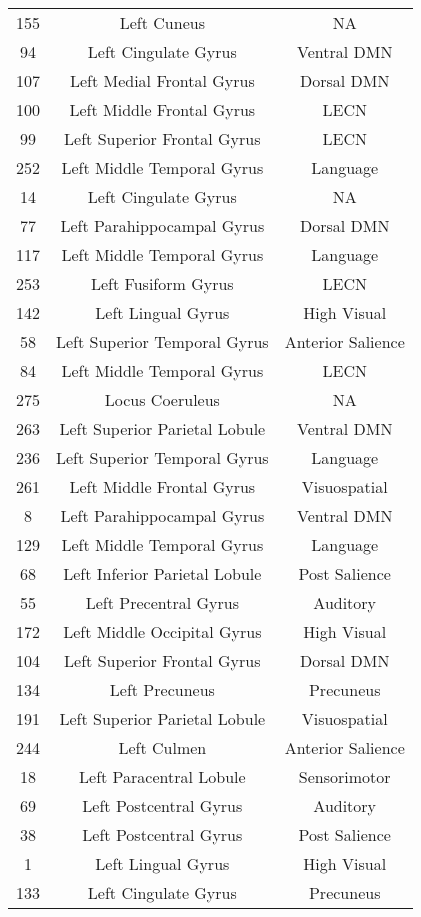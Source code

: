 \documentclass[10pt,letterpaper]{article}\usepackage[]{graphicx}\usepackage[]{color}
\begin{document}
\begin{center}
\begin{longtable}[c]{ccc}
		155	& Left Cuneus & NA \\
		94 & Left Cingulate Gyrus & Ventral DMN \\
		107	& Left Medial Frontal Gyrus	& Dorsal DMN \\
		100	& Left Middle Frontal Gyrus	& LECN \\
		99 & Left Superior Frontal Gyrus & LECN \\
		252	& Left Middle Temporal Gyrus & Language \\
		14 & Left Cingulate Gyrus & NA \\
		77 & Left Parahippocampal Gyrus	& Dorsal DMN \\
		117	& Left Middle Temporal Gyrus & Language \\
		253	& Left Fusiform Gyrus & LECN \\
		142	& Left Lingual Gyrus & High Visual \\
		58 & Left Superior Temporal Gyrus & Anterior Salience \\
		84 & Left Middle Temporal Gyrus	& LECN \\
		275	& Locus Coeruleus & NA \\
		263	& Left Superior Parietal Lobule	& Ventral DMN \\
		236	& Left Superior Temporal Gyrus & Language \\
		261	& Left Middle Frontal Gyrus	& Visuospatial \\
		8 & Left Parahippocampal Gyrus & Ventral DMN \\
		129	& Left Middle Temporal Gyrus & Language \\
		68 & Left Inferior Parietal Lobule & Post Salience \\
		55 & Left Precentral Gyrus & Auditory \\
		172	& Left Middle Occipital Gyrus & High Visual \\
		104	& Left Superior Frontal Gyrus & Dorsal DMN \\
		134	& Left Precuneus & Precuneus \\
		191	& Left Superior Parietal Lobule	& Visuospatial \\
		244	& Left Culmen & Anterior Salience \\
		18 & Left Paracentral Lobule & Sensorimotor \\
		69 & Left Postcentral Gyrus	& Auditory \\
		38 & Left Postcentral Gyrus	& Post Salience \\
		1 & Left Lingual Gyrus & High Visual \\
		133	& Left Cingulate Gyrus & Precuneus \\

\end{longtable}
\end{center}
\end{document}
